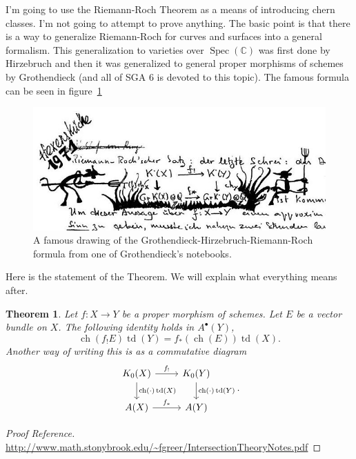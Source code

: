\documentclass[12pt]{article}
\numberwithin{equation}{section}
\newtheorem{theorem}{Theorem}[subsection]
\theoremstyle{definition}
\theoremstyle{remark}
\newcommand{\CC}{\mathbb{C}}
\newcommand{\Spec}{\operatorname{Spec}}
\newcommand{\ch}{\operatorname{ch}}
\newcommand{\td}{\operatorname{td}}
\begin{document}
I'm going to use the Riemann-Roch Theorem as a means of introducing chern classes. I'm not going to attempt to prove anything. 
The basic point is that there is a way to generalize Riemann-Roch for curves and surfaces into a general formalism. 
This generalization to varieties over $\Spec(\CC)$ was first done by Hirzebruch and then it was generalized to general proper morphisms of schemes by Grothendieck (and all of SGA 6 is devoted to this topic). 
The famous formula can be seen in figure~\ref{fig:grr}
\begin{figure}[h]
	\begin{center}
		\includegraphics[scale=0.5]{grr.jpeg}
	\end{center}
	\caption{A famous drawing of the Grothendieck-Hirzebruch-Riemann-Roch formula from one of Grothendieck's notebooks. }\label{fig:grr}
\end{figure}

Here is the statement of the Theorem. 
We will explain what everything means after. 
\begin{theorem}
	Let $f:X\to Y$ be a proper morphism of schemes. 
	Let $E$ be a vector bundle on $X$. 
	The following identity holds in $A^{\bullet}(Y)$,
	\begin{equation}
	\ch(f_{!}E) \td(Y) = f_* (\ch(E)) \td(X).
	\end{equation}
	Another way of writing this is as a commutative diagram
	$$\begin{tikzcd}
	K_0(X) \ar[r,"f_!"] \ar[d, "\ch(\cdot)\td(X)"]& K_0(Y) \ar[d,"\ch(\cdot)\td(Y)"]\\
	A(X) \ar[r,"f_*"] & A(Y)
	\end{tikzcd}.$$
\end{theorem}
\begin{proof}[Proof Reference]
	\url{http://www.math.stonybrook.edu/~fgreer/IntersectionTheoryNotes.pdf}
\end{proof}
\end{document}
